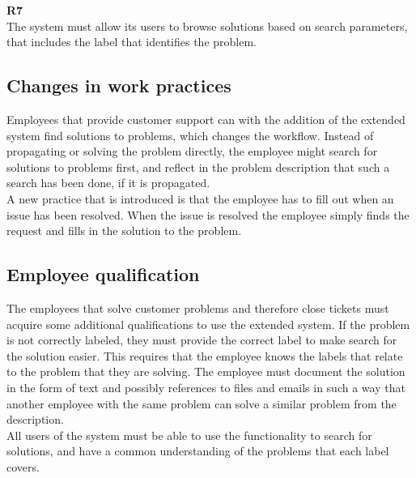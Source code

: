 \textbf{R7} \\
The system must allow its users to browse solutions based on search parameters, that includes the label that identifies the problem.

\subsection{Changes in work practices}
Employees that provide customer support can with the addition of the extended system find solutions to problems, which changes the workflow. Instead of propagating or solving the problem directly, the employee might search for solutions to problems first, and reflect in the problem description that such a search has been done, if it is propagated.\\
A new practice that is introduced is that the employee has to fill out when an issue has been resolved. When the issue is resolved the employee simply finds the request and fills in the solution to the problem.

\subsection{Employee qualification}
\label{subsec:qualification}
The employees that solve customer problems and therefore close tickets must acquire some additional qualifications to use the extended system. If the problem is not correctly labeled, they must provide the correct label to make search for the solution easier. This requires that the employee knows the labels that relate to the problem that they are solving. The employee must document the solution in the form of text and possibly references to files and emails in such a way that another employee with the same problem can solve a similar problem from the description.\\
All users of the system must be able to use the functionality to search for solutions, and have a common understanding of the problems that each label covers.


